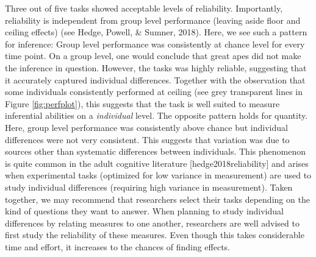 \documentclass[10pt, letterpaper]{article}
\begin{document}
Three out of five tasks showed acceptable levels of reliability.
Importantly, reliability is independent from group level performance
(leaving aside floor and ceiling effects) (see Hedge, Powell, \& Sumner,
2018). Here, we see such a pattern for inference: Group level
performance was consistently at chance level for every time point. On a
group level, one would conclude that great apes did not make the
inference in question. However, the tasks was highly reliable,
suggesting that it accurately captured individual differences. Together
with the observation that some individuals consistently performed at
ceiling (see grey transparent lines in Figure \ref{fig:perfplot}), this
suggests that the task is well suited to measure inferential abilities
on a \emph{individual} level. The opposite pattern holds for quantity.
Here, group level performance was consistently above chance but
individual differences were not very consistent. This suggests that
variation was due to sources other than systematic differences between
individuals. This phenomenon is quite common in the adult cognitive
literature {[}hedge2018reliability{]} and arises when experimental tasks
(optimized for low variance in measurement) are used to study individual
differences (requiring high variance in measurement). Taken together, we
may recommend that researchers select their tasks depending on the kind
of questions they want to answer. When planning to study individual
differences by relating measures to one another, researchers are well
advised to first study the reliability of these measures. Even though
this takes considerable time and effort, it increases to the chances of
finding effects.
\end{document}

